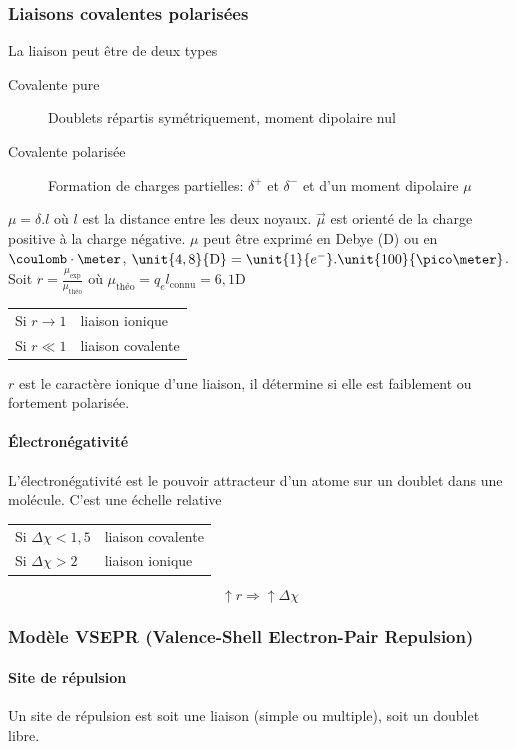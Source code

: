 \documentclass[11pt,a4paper,french]{article}
\newcommand\debye{\mathrm{D}}
\begin{document}
\subsubsection{Liaisons covalentes polarisées}
La liaison peut être de deux types
\begin{description}
	\item[Covalente pure] Doublets répartis symétriquement, moment dipolaire nul
	\item[Covalente polarisée] Formation de charges partielles: $\delta^+$ et $\delta^-$ et d'un moment dipolaire $\mu$
\end{description}
$\mu = \delta . l$ où $l$ est la distance entre les deux noyaux.
$\vec{\mu}$ est orienté de la charge positive à la charge négative.
$\mu$ peut être exprimé en Debye ($\debye$) ou en $\coulomb\cdot\meter$, $\unit{4,8}{\debye} = \unit{1}{e^-} . \unit{100}{\pico\meter}$.
Soit $r = \frac{\mu_{\mathrm{exp}}}{\mu_{\textrm{théo}}}$ où $\mu_{\textrm{théo}} = q_e l_{\mathrm{connu}} = \unit{6,1}{\debye}$
\begin{center}
	\begin{tabular}{ll}
		Si $r \to 1$ & liaison ionique\\
		Si $r \ll 1$ & liaison covalente
	\end{tabular}
\end{center}
$r$ est le caractère ionique d'une liaison, il détermine si elle est faiblement ou fortement polarisée.

\paragraph{\'Electronégativité}
L'électronégativité est le pouvoir attracteur d'un atome sur un doublet dans une molécule.
C'est une échelle relative
\begin{center}
	\begin{tabular}{ll}
		Si $\Delta \chi < 1,5$ & liaison covalente\\
		Si $\Delta \chi > 2$ & liaison ionique
	\end{tabular}
\end{center}
$$\uparrow r \Rightarrow \uparrow \Delta \chi$$

\subsubsection{Modèle VSEPR (Valence-Shell Electron-Pair Repulsion)}
\paragraph{Site de répulsion}
Un site de répulsion est soit une liaison (simple ou multiple), soit un doublet libre.
\end{document}
